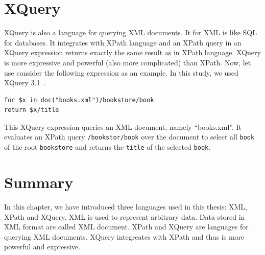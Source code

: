 \section{XQuery}

XQuery is also a language for querying XML documents. It for XML is like SQL for
databases. It integrates with XPath language and an XPath query in an XQuery
expression returns exactly the same result as in XPath language. XQuery is more
expressive and powerful (also more complicated) than XPath.  Now, let use
consider the following expression as an example. In this study, we used XQuery
3.1~\cite{XQuery3_1}.

\begin{lstlisting}
for $x in doc("books.xml")/bookstore/book
return $x/title
\end{lstlisting}

This XQuery expression queries an XML document, namely ``books.xml''. It
evaluates an XPath query \texttt{/bookstor/book} over the document to select all
\texttt{book} of the root \texttt{bookstore} and returns the \texttt{title} of
the selected \texttt{book}.

\section{Summary}

In this chapter, we have introduced three languages used in this thesis: XML,
XPath and XQuery. XML is used to represent arbitrary data. Data stored in XML
format are called XML document. XPath and XQuery are languages for querying XML
documents. XQuery integreates with XPath and thus is more powerful and
expressive.

